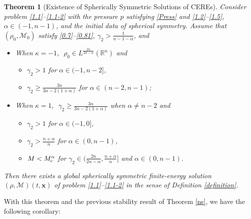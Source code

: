 \documentclass[reqno,11pt]{amsart}
\numberwithin{equation}{section}
\newtheorem{theorem}{Theorem}[section]
\theoremstyle{definition}
\def\M{{\mathcal{M}}}
\begin{document}
\begin{theorem}[Existence of Spherically Symmetric Solutions of CEREs]\label{existence}
Consider problem \eqref{1.1}--\eqref{1.1-2} with the pressure $p$ satisfying \eqref{Press} and \eqref{1.2}--\eqref{1.5}, $\alpha \in (-1,n-1)$,
and the initial data of spherical symmetry. Assume that $(\rho_0,\M_0)$ satisfy \eqref{0.7}--\eqref{0.81}, $\gamma_2 > \frac{1}{n-1-\alpha}$, and
\begin{itemize}
    \item When $\kappa = -1$,  $\,\,\rho_0 \in L^{\frac{2n}{2n - \alpha}}(\mathbb{R}^n)$ and
    \begin{itemize}
  \item [{\rm(a)}] $\gamma_2 > 1$ for $\alpha \in (-1,n-2]$,
\item[{\rm(b)}] $\gamma_2 \geq \frac{3n}{3n - 2(1+\alpha)}$ for $\alpha \in (n-2,n-1)${\rm ;}
    \end{itemize}
    \item When $\kappa = 1$, $\,\,\gamma_2 \geq \frac{3n}{3n - 2(1+\alpha)}$
when $\alpha \neq n-2$ and    
    \begin{itemize}
 \item[{\rm(c)}]  $\gamma_2 > 1$ for $\alpha \in (-1,0]$,
\item [{\rm(d)}] $\gamma_2 > \frac{n + \alpha}{n}$ for $\alpha \in (0,n-1)$,
\item[{\rm(e)}] $M < M_{\rm c}^\alpha$ for
 $\gamma_2 \in (\frac{2n}{2n - \alpha}, \frac{n + \alpha}{n}]$ and $\alpha \in (0,n-1)$.
    \end{itemize}
\end{itemize}
Then there exists a global spherically symmetric finite-energy solution
$(\rho,\M)(t,\boldsymbol{x})$ of problem \eqref{1.1}--\eqref{1.1-2}
in the sense of {\rm Definition \ref{definition}}.
\end{theorem}

With this theorem and the previous stability result of Theorem \ref{ns}, we have the following corollary:
\end{document}
